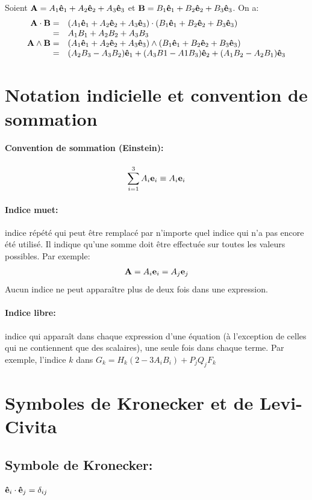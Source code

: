 Soient $\textbf{A}=A_1\textbf{ê}_1+A_2\textbf{ê}_2+A_3\textbf{ê}_3$ et $\textbf{B}=B_1\textbf{ê}_1+B_2\textbf{ê}_2+B_3\textbf{ê}_3$. On a:
$$\begin{array}{r l}
\textbf{A}\cdot\textbf{B} =&(A_1 \textbf{ê}_1+A_2\textbf{ê}_2+A_3\textbf{ê}_3)\cdot(B_1\textbf{ê}_1+B_2\textbf{ê}_2+B_3\textbf{ê}_3)\\
 =&A_1B_1 + A_2B_2+A_3B_3\\
\textbf{A}\wedge\textbf{B}=&(A_1 \textbf{ê}_1+A_2\textbf{ê}_2+A_3\textbf{ê}_3)\wedge(B_1\textbf{ê}_1+B_2\textbf{ê}_2+B_3\textbf{ê}_3)\\
 =&(A_2B_3-A_3B_2)\textbf{ê}_1+(A_3B1-A1B_3)\textbf{ê}_2+(A_1B_2-A_2B_1)\textbf{ê}_3\\
\end{array}$$

\section{Notation indicielle et convention de sommation}
\paragraph{Convention de sommation (Einstein):} $$\sum_{i=1}^3 A_i\textbf{e}_i \equiv A_i\textbf{e}_i$$
\paragraph{Indice muet:} indice répété qui peut être remplacé par n'importe quel indice qui n'a pas encore été utilisé. Il indique qu'une somme doit être effectuée sur toutes les valeurs possibles. Par exemple: $$\textbf{A}=A_i\textbf{e}_i=A_j\textbf{e}_j$$
Aucun indice ne peut apparaître plus de deux fois dans une expression.
\paragraph{Indice libre:} indice qui apparaît dans chaque expression d'une équation (à l'exception de celles qui ne contiennent que des scalaires), une seule fois dans chaque terme. Par exemple, l'indice $k$ dans $G_k = H_k(2-3A_iB_i)+P_jQ_jF_k$

\section{Symboles de Kronecker et de Levi-Civita}

\subsection{Symbole de Kronecker:} $\textbf{ê}_i\cdot\textbf{ê}_j=\delta_{ij}$

